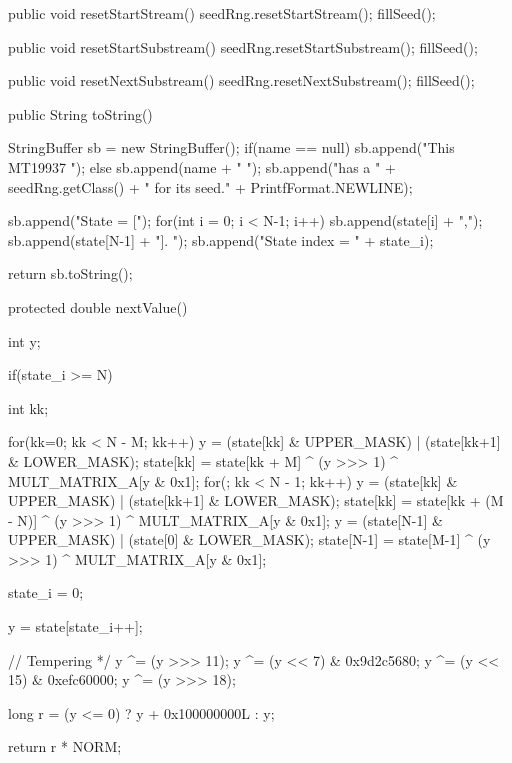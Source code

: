 \begin{code}\begin{hide}
   public void resetStartStream() {
      seedRng.resetStartStream();
      fillSeed();
   }

   public void resetStartSubstream() {
      seedRng.resetStartSubstream();
      fillSeed();
   }

   public void resetNextSubstream() {
      seedRng.resetNextSubstream();
      fillSeed();
   }

   public String toString() {
      StringBuffer sb = new StringBuffer();
      if(name == null)
         sb.append("This MT19937 ");
      else
         sb.append(name + " ");
      sb.append("has a " + seedRng.getClass() + " for its seed." +
         PrintfFormat.NEWLINE);

      sb.append("State = [");
      for(int i = 0; i < N-1; i++)
         sb.append(state[i] + ",");
      sb.append(state[N-1] + "]. ");
      sb.append("State index = " + state_i);

      return sb.toString();
   }

   protected double nextValue() {
      int y;

      if(state_i >= N) {
         int kk;

         for(kk=0; kk < N - M; kk++) {
            y = (state[kk] & UPPER_MASK) | (state[kk+1] & LOWER_MASK);
            state[kk] = state[kk + M] ^ (y >>> 1) ^
                        MULT_MATRIX_A[y & 0x1];
         }
         for(; kk < N - 1; kk++) {
            y = (state[kk] & UPPER_MASK) | (state[kk+1] & LOWER_MASK);
            state[kk] = state[kk + (M - N)] ^ (y >>> 1) ^
                        MULT_MATRIX_A[y & 0x1];
         }
         y = (state[N-1] & UPPER_MASK) | (state[0] & LOWER_MASK);
         state[N-1] = state[M-1] ^ (y >>> 1) ^
                      MULT_MATRIX_A[y & 0x1];

         state_i = 0;
      }

      y = state[state_i++];

      // Tempering */
      y ^= (y >>> 11);
      y ^= (y << 7) & 0x9d2c5680;
      y ^= (y << 15) & 0xefc60000;
      y ^= (y >>> 18);

      long r = (y <= 0) ? y + 0x100000000L : y;

      return r * NORM;
   }\end{hide}
\end{code}

\begin{code}
\begin{hide}
}\end{hide}
\end{code}

